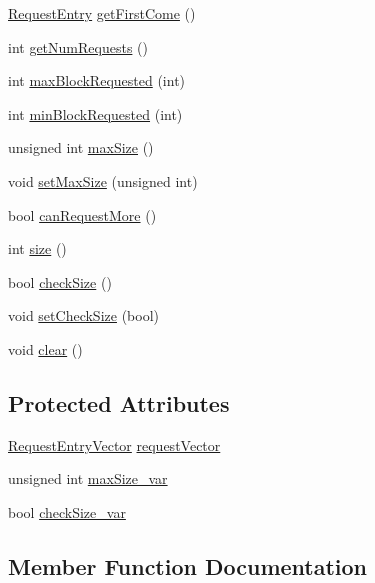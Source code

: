 \begin{DoxyCompactItemize}
\item 
\hyperlink{classRequestEntry}{Request\+Entry} \hyperlink{classRequestState_a4f4049ae8d8ece59da9a23cbaf4d1647}{get\+First\+Come} ()
\item 
int \hyperlink{classRequestState_a0d1e170fc76766e00fedaeed143c4a9e}{get\+Num\+Requests} ()
\item 
int \hyperlink{classRequestState_a895ffd3e74a15ee43c528686e41ad90f}{max\+Block\+Requested} (int)
\item 
int \hyperlink{classRequestState_ad2e5ee757eb3bfe857659bf8358b9e1b}{min\+Block\+Requested} (int)
\item 
unsigned int \hyperlink{classRequestState_aec74e416ae1806a0e644c89630900584}{max\+Size} ()
\item 
void \hyperlink{classRequestState_a33ece5716af3a8151c66ed0e61afacb9}{set\+Max\+Size} (unsigned int)
\item 
bool \hyperlink{classRequestState_a22466a48dc196cc6c624aa68eae4c95e}{can\+Request\+More} ()
\item 
int \hyperlink{classRequestState_a380d94594bdf87f7e1ba94290a375fdc}{size} ()
\item 
bool \hyperlink{classRequestState_a8febe67f78e25aaf5255aa695e47c8d6}{check\+Size} ()
\item 
void \hyperlink{classRequestState_ab4b182ebffa1f492a81fce25d8ab4f22}{set\+Check\+Size} (bool)
\item 
void \hyperlink{classRequestState_af539f838900e758ddccc3373ace678b0}{clear} ()
\end{DoxyCompactItemize}
\subsection*{Protected Attributes}
\begin{DoxyCompactItemize}
\item 
\hyperlink{BTUtils_8h_a23f79ef107bda748bd273978e5eea31a}{Request\+Entry\+Vector} \hyperlink{classRequestState_ac61708dc216522bb0cac60a9d6742569}{request\+Vector}
\item 
unsigned int \hyperlink{classRequestState_a522c2201650b04cf0c6db6851bb5920b}{max\+Size\+\_\+var}
\item 
bool \hyperlink{classRequestState_ab245f922913e545c7509a9955a4e2575}{check\+Size\+\_\+var}
\end{DoxyCompactItemize}


\subsection{Member Function Documentation}
\hypertarget{classRequestState_aeade20f4a2271803ef166ca390c26d9c}{}
